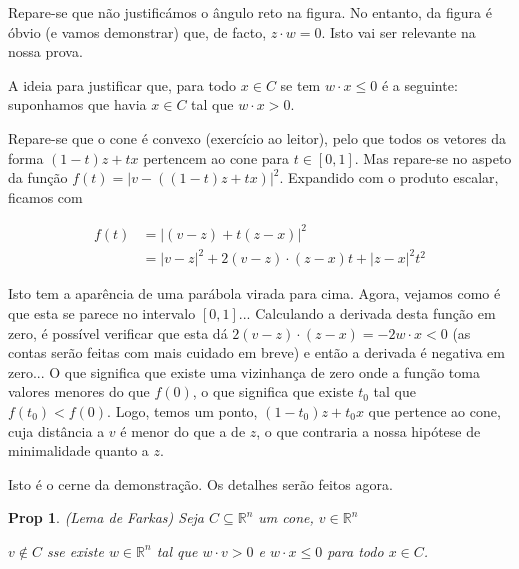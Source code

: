 \documentclass{article}
\newcommand{\R}{\mathbb{R}}
\newtheorem{prop}{Prop}
\theoremstyle{definition}
\begin{document}
	Repare-se que não justificámos o ângulo reto na figura. No entanto, da figura é óbvio (e vamos demonstrar) que, de facto, $z \cdot w = 0$. Isto vai ser relevante na nossa prova.
	
	A ideia para justificar que, para todo $x \in C$ se tem $w \cdot x \leq 0$ é a seguinte: suponhamos que havia $x \in C$ tal que $w \cdot x > 0$.
	
	Repare-se que o cone é convexo (exercício ao leitor), pelo que todos os vetores da forma $(1-t) z + t x$ pertencem ao cone para $t \in [0,1]$. Mas repare-se no aspeto da função $f(t) = \lvert v - ((1-t) z + t x) \rvert ^2$. Expandido com o produto escalar, ficamos com
	
	\begin{align*}
	f(t) &= \lvert(v - z) + t(z - x)\rvert^2 \\
	&= \lvert v-z \rvert^2 + 2 (v - z) \cdot (z - x) t + \lvert z - x \rvert^2 t^2
	\end{align*}
	
	Isto tem a aparência de uma parábola virada para cima. Agora, vejamos como é que esta se parece no intervalo $[0,1]$... Calculando a derivada desta função em zero, é possível verificar que esta dá $2 (v - z) \cdot (z - x) = - 2 w \cdot x < 0$ (as contas serão feitas com mais cuidado em breve) e então a derivada é negativa em zero... O que significa que existe uma vizinhança de zero onde a função toma valores menores do que $f(0)$, o que significa que existe $t_0$ tal que $f(t_0) < f(0)$. Logo, temos um ponto, $(1-t_0) z + t_0 x$ que pertence ao cone, cuja distância a $v$ é menor do que a de $z$, o que contraria a nossa hipótese de minimalidade quanto a $z$.
	
	Isto é o cerne da demonstração. Os detalhes serão feitos agora.
	
	\begin{prop} (Lema de Farkas)
	Seja $C \subseteq \R^n$ um cone, $v \in \R^n$
	
	$v \not \in C$ sse existe $w \in \R^n$ tal que $w \cdot v > 0$ e $w \cdot x \leq 0$ para todo $x \in C$.
	\end{prop}
	
\end{document}
